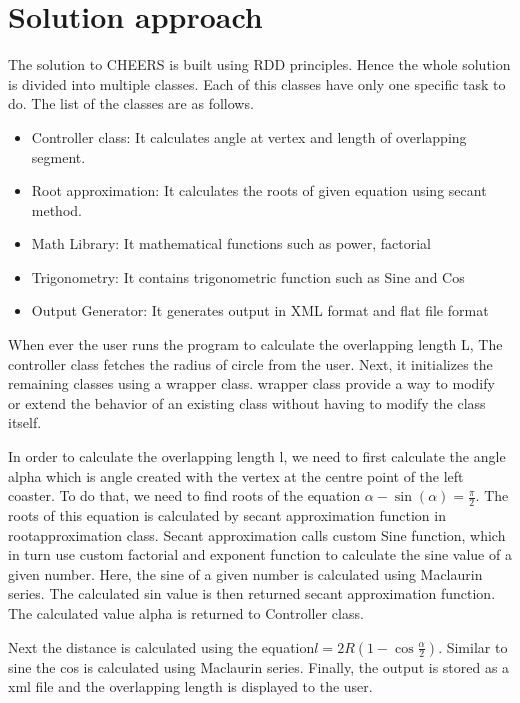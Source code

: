 \section{Solution approach}
\begin{flushleft}
The solution to CHEERS is built using RDD principles. Hence the whole solution is divided into multiple classes. Each of this classes have only one specific task to do. The list of the classes are as follows.
\begin{itemize}
  \item Controller class: It calculates angle at vertex and length of overlapping segment.
  \item Root approximation: It calculates the roots of given equation using secant method.
  \item Math Library: It mathematical functions such as power, factorial
  \item Trigonometry: It contains trigonometric function such as Sine and Cos
  \item Output Generator: It generates output in XML format and flat file format
\end{itemize}

When ever the user runs the  program to calculate the overlapping length L, The controller class fetches the radius of circle from the user. Next, it initializes the remaining classes using a wrapper class. wrapper class provide a way to modify or extend the behavior of an existing class without having to modify the class itself. 
\end{flushleft}
\begin{flushleft}
In order to calculate the overlapping length l, we need to first calculate the angle alpha which is angle created with the vertex at the centre point of the left coaster. To do that, we need to find roots of the equation $\alpha - \sin(\alpha) = \frac{\pi}{2}$. 
The roots of this equation is calculated by secant approximation function in rootapproximation class. Secant approximation calls custom Sine function, which in turn use custom factorial and exponent function to calculate the sine value of a given number. 
Here, the sine of a given number is calculated using Maclaurin series. The calculated sin value is then returned secant approximation function. 
The calculated value alpha is returned to Controller class.
\end{flushleft}
\begin{flushleft}
  Next the distance is calculated using the equation$l = 2R\left(1 - \cos\frac{\alpha}{2}\right)$. Similar to sine the cos is calculated using Maclaurin series. Finally, the output is stored as a xml file and the overlapping  length is displayed to the user.
\end{flushleft}
    \pagebreak

